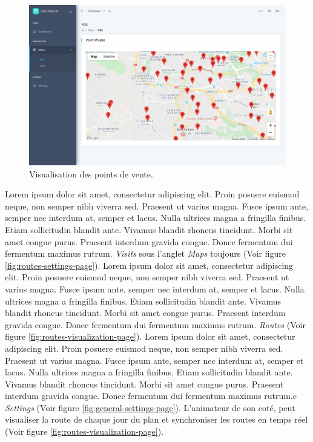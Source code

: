 \begin{figure}[hbt!]
  \centering
  \includegraphics[width=15cm]{images_pfe/pos_visualization.png}
  \caption{Visualisation des points de vente.}
  \label{fig:pos-page}
\end{figure}
\FloatBarrier

Lorem ipsum dolor sit amet, consectetur adipiscing elit. Proin posuere euismod neque, non semper nibh viverra sed. Praesent ut varius magna. Fusce ipsum ante, semper nec interdum at, semper et lacus. Nulla ultrices magna a fringilla finibus. Etiam sollicitudin blandit ante. Vivamus blandit rhoncus tincidunt. Morbi sit amet congue purus. Praesent interdum gravida congue. Donec fermentum dui fermentum maximus rutrum. \textit{Visits} sous l'anglet \textit{Maps} toujours (Voir figure \ref{fig:routes-settings-page}). Lorem ipsum dolor sit amet, consectetur adipiscing elit. Proin posuere euismod neque, non semper nibh viverra sed. Praesent ut varius magna. Fusce ipsum ante, semper nec interdum at, semper et lacus. Nulla ultrices magna a fringilla finibus. Etiam sollicitudin blandit ante. Vivamus blandit rhoncus tincidunt. Morbi sit amet congue purus. Praesent interdum gravida congue. Donec fermentum dui fermentum maximus rutrum. \textit{Routes} (Voir figure \ref{fig:routes-visualization-page}). Lorem ipsum dolor sit amet, consectetur adipiscing elit. Proin posuere euismod neque, non semper nibh viverra sed. Praesent ut varius magna. Fusce ipsum ante, semper nec interdum at, semper et lacus. Nulla ultrices magna a fringilla finibus. Etiam sollicitudin blandit ante. Vivamus blandit rhoncus tincidunt. Morbi sit amet congue purus. Praesent interdum gravida congue. Donec fermentum dui fermentum maximus rutrum.e \textit{Settings} (Voir figure \ref{fig:general-settings-page}). L'animateur de son coté, peut visualiser la route de chaque jour du plan et synchroniser les routes en temps réel (Voir figure \ref{fig:routes-visualization-page}).


